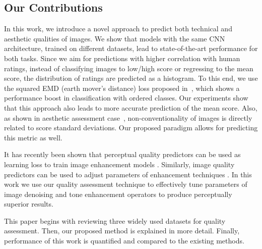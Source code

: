 \documentclass[10pt,twocolumn,twoside]{IEEEtran}
\begin{document}
 \subsection{Our Contributions}
In this work, we introduce a novel approach to predict both technical and aesthetic qualities of images. We show that models with the same CNN architecture, trained on different datasets, lead to state-of-the-art performance for both tasks. Since we aim for predictions with higher correlation with human ratings, instead of classifying images to low/high score or regressing to the mean score, the distribution of ratings are predicted as a histogram. To this end, we use the squared EMD (earth mover's distance) loss proposed in~\cite{hou2016squared}, which shows a performance boost in classification with ordered classes. Our experiments show that this approach also leads to more accurate prediction of the mean score. Also, as shown in aesthetic assessment case~\cite{murray2012ava}, non-conventionality of images is directly related to score standard deviations. Our proposed paradigm allows for predicting this metric as well.

It has recently been shown that perceptual quality predictors can be used as learning loss to train image enhancement models \cite{zhang2018unreasonable, talebi2017learned}. Similarly, image quality predictors can be used to adjust parameters of enhancement techniques \cite{gu2016analysis}. In this work we use our quality assessment technique to effectively tune parameters of image denoising and tone enhancement operators to produce perceptually superior results. 

This paper begins with reviewing three widely used datasets for quality assessment. Then, our proposed method is explained in more detail. Finally, performance of this work is quantified and compared to the existing methods. 
\end{document}
